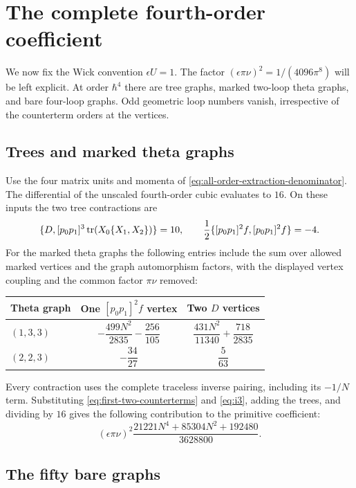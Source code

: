 \section{The complete fourth-order coefficient}
\label{sec:fourth-order}

We now fix the Wick convention $\epsilon U=1$. The factor
$(\epsilon\pi\nu)^2=1/(4096\pi^8)$ will be left explicit.
At order $\hbar^4$ there are tree graphs, marked two-loop
theta graphs, and bare four-loop graphs. Odd geometric loop
numbers vanish, irrespective of the counterterm orders at
the vertices.

\subsection{Trees and marked theta graphs}

Use the four matrix units and momenta of
\eqref{eq:all-order-extraction-denominator}. The differential
of the unscaled fourth-order cubic evaluates to $16$.
On these inputs the two tree contractions are
\[
 \{D,[p_0p_1]^3\operatorname{tr}(X_0\{X_1,X_2\})\}=10,\qquad
 \frac12\{[p_0p_1]^2f,[p_0p_1]^2f\}=-4.
\]
For the marked theta graphs the following entries include
the sum over allowed marked vertices and the graph
automorphism factors, with the displayed vertex coupling
and the common factor $\pi\nu$ removed:
\begin{center}
\renewcommand{\arraystretch}{1.7}
\begin{tabular}{@{}lcc@{}}
\toprule
Theta graph & One $[p_0p_1]^2f$ vertex & Two $D$ vertices\\
\midrule
$(1,3,3)$ & $-\dfrac{499N^2}{2835}-\dfrac{256}{105}$
  & $\dfrac{431N^2}{11340}+\dfrac{718}{2835}$\\
$(2,2,3)$ & $-\dfrac{34}{27}$ & $\dfrac5{63}$\\
\bottomrule
\end{tabular}
\end{center}
Every contraction uses the complete traceless inverse pairing,
including its $-1/N$ term. Substituting
\eqref{eq:first-two-counterterms} and \eqref{eq:i3}, adding the
trees, and dividing by $16$ gives the following contribution
to the primitive coefficient:
\begin{equation}
 (\epsilon\pi\nu)^2
       \frac{21221N^4+85304N^2+192480}{3628800}.
 \label{eq:four-tree-marked}
\end{equation}

\subsection{The fifty bare graphs}

